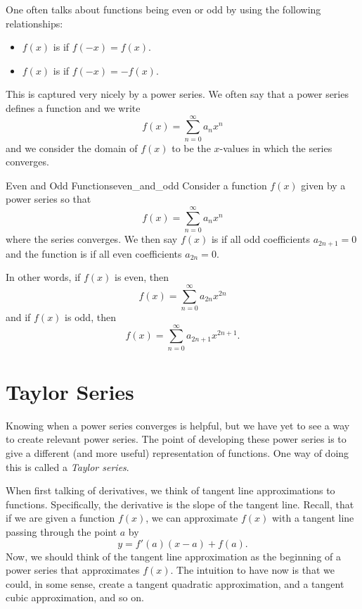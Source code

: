 One often talks about functions being even or odd by using the following relationships: 
\begin{itemize}
    \item $f(x)$ is  if $f(-x)=f(x)$.
    \item $f(x)$ is  if $f(-x)=-f(x)$.
\end{itemize}
This is captured very nicely by a power series. We often say that a power series defines a function and we write
\[
f(x)=\sum_{n=0}^\infty a_n x^n
\]
and we consider the domain of $f(x)$ to be the $x$-values in which the series converges.  

\begin{prop}{Even and Odd Functions}{even_and_odd}
Consider a function $f(x)$ given by a power series so that
\[
f(x) = \sum_{n=0}^\infty a_n x^n
\]
where the series converges. We then say $f(x)$ is  if all odd coefficients $a_{2n+1}=0$ and the function is  if all even coefficients $a_{2n}=0$.  

In other words, if $f(x)$ is even, then
\[
f(x)=\sum_{n=0}^\infty a_{2n}x^{2n}
\]
and if $f(x)$ is odd, then
\[
f(x)=\sum_{n=0}^\infty a_{2n+1}x^{2n+1}.
\]
\end{prop}

\section{Taylor Series}

Knowing when a power series converges is helpful, but we have yet to see a way to create relevant power series.  The point of developing these power series is to give a different (and more useful) representation of functions. One way of doing this is called a \emph{Taylor series}.

When first talking of derivatives, we think of tangent line approximations to functions.  Specifically, the derivative is the slope of the tangent line.  Recall, that if we are given a function $f(x)$, we can approximate $f(x)$ with a tangent line passing through the point $a$ by
\[
y = f'(a)(x-a)+f(a).
\]
Now, we should think of the tangent line approximation as the beginning of a power series that approximates $f(x)$.  The intuition to have now is that we could, in some sense, create a tangent quadratic approximation, and a tangent cubic approximation, and so on.  


